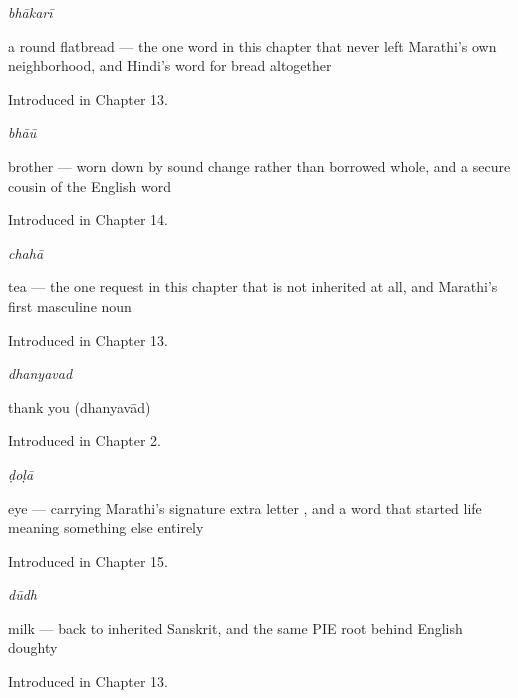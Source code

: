 \noindent\begin{minipage}[t]{\linewidth}
\raggedright
\textbf{}\enspace\emph{bhākarī}\par
\small a round flatbread — the one word in this chapter that never left Marathi's own neighborhood, and Hindi's word for bread altogether\par
\footnotesize Introduced in Chapter 13.
\end{minipage}\par\medskip

\noindent\begin{minipage}[t]{\linewidth}
\raggedright
\textbf{}\enspace\emph{bhāū}\par
\small brother — worn down by sound change rather than borrowed whole, and a secure cousin of the English word\par
\footnotesize Introduced in Chapter 14.
\end{minipage}\par\medskip

\noindent\begin{minipage}[t]{\linewidth}
\raggedright
\textbf{}\enspace\emph{chahā}\par
\small tea — the one request in this chapter that is not inherited at all, and Marathi's first masculine noun\par
\footnotesize Introduced in Chapter 13.
\end{minipage}\par\medskip

\noindent\begin{minipage}[t]{\linewidth}
\raggedright
\textbf{}\enspace\emph{dhanyavad}\par
\small thank you (dhanyavād)\par
\footnotesize Introduced in Chapter 2.
\end{minipage}\par\medskip

\noindent\begin{minipage}[t]{\linewidth}
\raggedright
\textbf{}\enspace\emph{ḍoḷā}\par
\small eye — carrying Marathi's signature extra letter , and a word that started life meaning something else entirely\par
\footnotesize Introduced in Chapter 15.
\end{minipage}\par\medskip

\noindent\begin{minipage}[t]{\linewidth}
\raggedright
\textbf{}\enspace\emph{dūdh}\par
\small milk — back to inherited Sanskrit, and the same PIE root behind English doughty\par
\footnotesize Introduced in Chapter 13.
\end{minipage}\par\medskip

